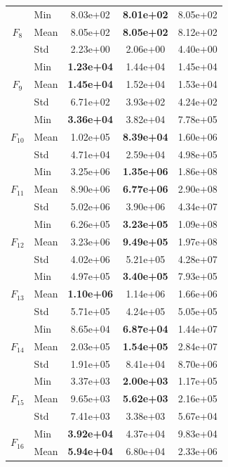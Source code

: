 \begin{center}
\begin{longtable}{clccc}
\midrule
\multirow{3}{*}{$F_{8}$} & Min & 8.03e+02 & \textbf{8.01e+02} & 8.05e+02 \\
 & Mean & 8.05e+02 & \textbf{8.05e+02} & 8.12e+02 \\
 & Std & 2.23e+00 & 2.06e+00 & 4.40e+00 \\
\midrule
\multirow{3}{*}{$F_{9}$} & Min & \textbf{1.23e+04} & 1.44e+04 & 1.45e+04 \\
 & Mean & \textbf{1.45e+04} & 1.52e+04 & 1.53e+04 \\
 & Std & 6.71e+02 & 3.93e+02 & 4.24e+02 \\
\midrule
\multirow{3}{*}{$F_{10}$} & Min & \textbf{3.36e+04} & 3.82e+04 & 7.78e+05 \\
 & Mean & 1.02e+05 & \textbf{8.39e+04} & 1.60e+06 \\
 & Std & 4.71e+04 & 2.59e+04 & 4.98e+05 \\
\midrule
\multirow{3}{*}{$F_{11}$} & Min & 3.25e+06 & \textbf{1.35e+06} & 1.86e+08 \\
 & Mean & 8.90e+06 & \textbf{6.77e+06} & 2.90e+08 \\
 & Std & 5.02e+06 & 3.90e+06 & 4.34e+07 \\
\midrule
\multirow{3}{*}{$F_{12}$} & Min & 6.26e+05 & \textbf{3.23e+05} & 1.09e+08 \\
 & Mean & 3.23e+06 & \textbf{9.49e+05} & 1.97e+08 \\
 & Std & 4.02e+06 & 5.21e+05 & 4.28e+07 \\
\midrule
\multirow{3}{*}{$F_{13}$} & Min & 4.97e+05 & \textbf{3.40e+05} & 7.93e+05 \\
 & Mean & \textbf{1.10e+06} & 1.14e+06 & 1.66e+06 \\
 & Std & 5.71e+05 & 4.24e+05 & 5.05e+05 \\
\midrule
\multirow{3}{*}{$F_{14}$} & Min & 8.65e+04 & \textbf{6.87e+04} & 1.44e+07 \\
 & Mean & 2.03e+05 & \textbf{1.54e+05} & 2.84e+07 \\
 & Std & 1.91e+05 & 8.41e+04 & 8.70e+06 \\
\midrule
\multirow{3}{*}{$F_{15}$} & Min & 3.37e+03 & \textbf{2.00e+03} & 1.17e+05 \\
 & Mean & 9.65e+03 & \textbf{5.62e+03} & 2.16e+05 \\
 & Std & 7.41e+03 & 3.38e+03 & 5.67e+04 \\
\midrule
\multirow{3}{*}{$F_{16}$} & Min & \textbf{3.92e+04} & 4.37e+04 & 9.83e+04 \\
 & Mean & \textbf{5.94e+04} & 6.80e+04 & 2.33e+06 \\

\end{longtable}
\end{center}
